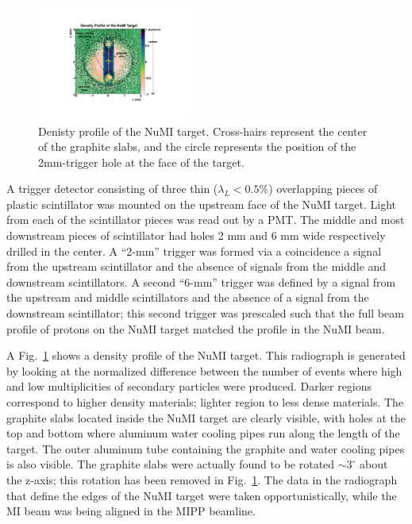 \documentclass[%
aps, prd, reprint, show pacs, preprint numbers, ams math, amssymb, superscriptaddress, linenumbers]{revtex4-1}
\begin{document}
\begin{figure}[t]
   \centering
   \includegraphics[width=0.45\textwidth]{trgt_profile2}
   \caption{Denisty profile of the NuMI target.  Cross-hairs represent the center
of the graphite slabs, and the circle represents the position of the 
2mm-trigger hole at the face of the target.}
   \label{fig:trgtprof}
\end{figure}

A trigger detector consisting of three thin ($\lambda_L < 0.5\%$) overlapping pieces of plastic scintillator was 
mounted on the upstream face of the NuMI target.  Light from each of the scintillator pieces was read out by a PMT.  
The middle and most downstream pieces of scintillator had holes 2 mm and 6 mm wide respectively drilled in the 
center.  A ``2-mm'' trigger was formed via a coincidence a signal from the upstream scintillator and the absence of signals 
from the middle and downstream scintillators.  A second ``6-mm'' trigger was defined by a signal from the upstream and 
middle scintillators and the absence of a signal from the downstream scintillator; this second trigger was prescaled
such that the full beam profile of protons on the NuMI target matched the profile in the NuMI beam.

A Fig.~\ref{fig:trgtprof} shows a density profile of the NuMI target.  
This radiograph is generated by looking at the normalized difference 
between the number of events where high and low multiplicities of secondary particles were produced.
Darker regions correspond to higher density materials; lighter region to less dense 
materials.  The graphite slabs located inside the NuMI target are clearly 
visible, with holes at the top and bottom where aluminum water cooling pipes 
run along the length of the target.  The outer aluminum tube containing the 
graphite and water cooling pipes is also visible.  The graphite slabs were 
actually found to be rotated $\sim 3^{\circ}$ about the z-axis; this rotation
has been removed in Fig.~\ref{fig:trgtprof}.  The data in the radiograph that define the edges of the 
NuMI target were taken opportunistically, while the MI beam was being aligned in the MIPP beamline.
\end{document}
